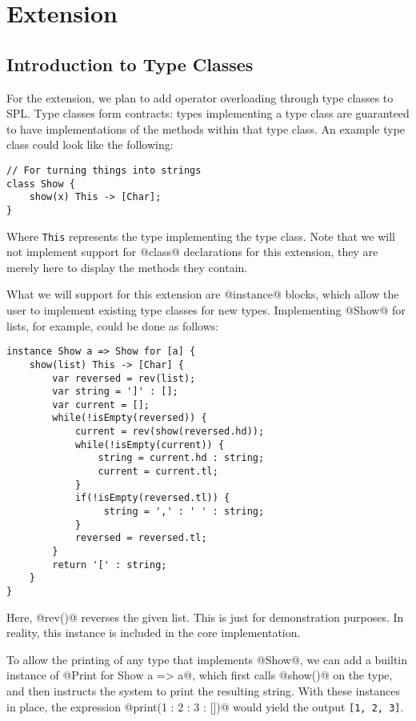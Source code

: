 \chapter{Extension}\label{chapter:extension}

\section{Introduction to Type Classes}
For the extension, we plan to add operator overloading through type classes to SPL. Type classes form contracts: types implementing a type class are guaranteed to have implementations of the methods within that type class. An example type class could look like the following:

\begin{lstlisting}
// For turning things into strings
class Show {
    show(x) This -> [Char];
}
\end{lstlisting}

Where \lstinline{This} represents the type implementing the type class. Note that we will not implement support for @class@ declarations for this extension, they are merely here to display the methods they contain.

What we will support for this extension are @instance@ blocks, which allow the user to implement existing type classes for new types. Implementing @Show@ for lists, for example, could be done as follows:

\begin{lstlisting}
instance Show a => Show for [a] {
    show(list) This -> [Char] {
        var reversed = rev(list);
        var string = ']' : [];
        var current = [];
        while(!isEmpty(reversed)) {
            current = rev(show(reversed.hd));
            while(!isEmpty(current)) {
                string = current.hd : string;
                current = current.tl;
            }
            if(!isEmpty(reversed.tl)) {
                 string = ',' : ' ' : string;
            }
            reversed = reversed.tl;
        }
        return '[' : string;
    }
}
\end{lstlisting}

Here, @rev()@ reverses the given list. This is just for demonstration purposes. In reality, this instance is included in the core implementation.

To allow the printing of any type that implements @Show@, we can add a builtin instance of @Print for Show a => a@, which first calls @show()@ on the type, and then instructs the system to print the resulting string. With these instances in place, the expression @print(1 : 2 : 3 : [])@ would yield the output \lstinline[language={}]|[1, 2, 3]|.

